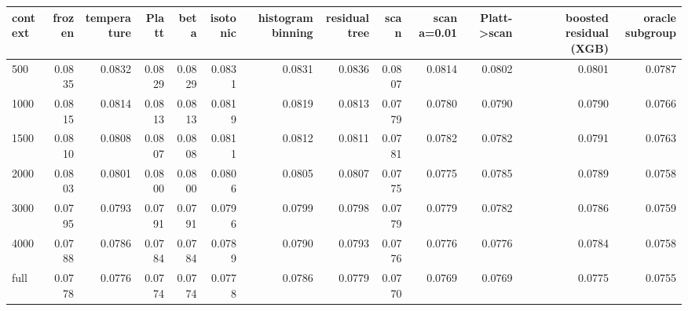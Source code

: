 \begin{tabular}{lrrrrrrrrrrrr}
\toprule
context & frozen & temperature & Platt & beta & isotonic & histogram binning & residual tree & scan & scan a=0.01 & Platt->scan & boosted residual (XGB) & oracle subgroup \\
\midrule
500 & 0.0835 & 0.0832 & 0.0829 & 0.0829 & 0.0831 & 0.0831 & 0.0836 & 0.0807 & 0.0814 & 0.0802 & 0.0801 & 0.0787 \\
1000 & 0.0815 & 0.0814 & 0.0813 & 0.0813 & 0.0819 & 0.0819 & 0.0813 & 0.0779 & 0.0780 & 0.0790 & 0.0790 & 0.0766 \\
1500 & 0.0810 & 0.0808 & 0.0807 & 0.0808 & 0.0811 & 0.0812 & 0.0811 & 0.0781 & 0.0782 & 0.0782 & 0.0791 & 0.0763 \\
2000 & 0.0803 & 0.0801 & 0.0800 & 0.0800 & 0.0806 & 0.0805 & 0.0807 & 0.0775 & 0.0775 & 0.0785 & 0.0789 & 0.0758 \\
3000 & 0.0795 & 0.0793 & 0.0791 & 0.0791 & 0.0796 & 0.0799 & 0.0798 & 0.0779 & 0.0779 & 0.0782 & 0.0786 & 0.0759 \\
4000 & 0.0788 & 0.0786 & 0.0784 & 0.0784 & 0.0789 & 0.0790 & 0.0793 & 0.0776 & 0.0776 & 0.0776 & 0.0784 & 0.0758 \\
full & 0.0778 & 0.0776 & 0.0774 & 0.0774 & 0.0778 & 0.0786 & 0.0779 & 0.0770 & 0.0769 & 0.0769 & 0.0775 & 0.0755 \\
\bottomrule
\end{tabular}

